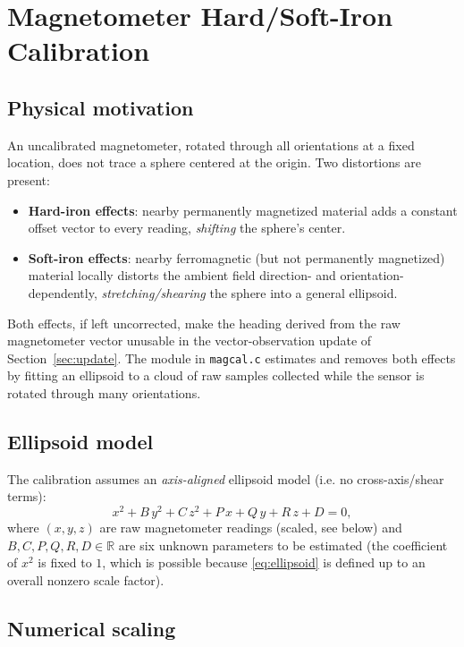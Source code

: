 \documentclass[11pt]{article}
\newcommand{\R}{\mathbb{R}}
\begin{document}
\section{Magnetometer Hard/Soft-Iron Calibration}

\subsection{Physical motivation}

An uncalibrated magnetometer, rotated through all orientations at a fixed location, does not trace a sphere centered at the origin. Two distortions are present:
\begin{itemize}
    \item \textbf{Hard-iron effects}: nearby permanently magnetized material adds a constant offset vector to every reading, \emph{shifting} the sphere's center.
    \item \textbf{Soft-iron effects}: nearby ferromagnetic (but not permanently magnetized) material locally distorts the ambient field direction- and orientation-dependently, \emph{stretching/shearing} the sphere into a general ellipsoid.
\end{itemize}
Both effects, if left uncorrected, make the heading derived from the raw magnetometer vector unusable in the vector-observation update of Section~\ref{sec:update}. The module in \texttt{magcal.c} estimates and removes both effects by fitting an ellipsoid to a cloud of raw samples collected while the sensor is rotated through many orientations.

\subsection{Ellipsoid model}

The calibration assumes an \emph{axis-aligned} ellipsoid model (i.e. no cross-axis/shear terms):
\begin{equation}
x^2 + B\,y^2 + C\,z^2 + P\,x + Q\,y + R\,z + D = 0,
\label{eq:ellipsoid}
\end{equation}
where $(x,y,z)$ are raw magnetometer readings (scaled, see below) and $B,C,P,Q,R,D\in\R$ are six unknown parameters to be estimated (the coefficient of $x^2$ is fixed to $1$, which is possible because \eqref{eq:ellipsoid} is defined up to an overall nonzero scale factor).

\subsection{Numerical scaling}
\end{document}
